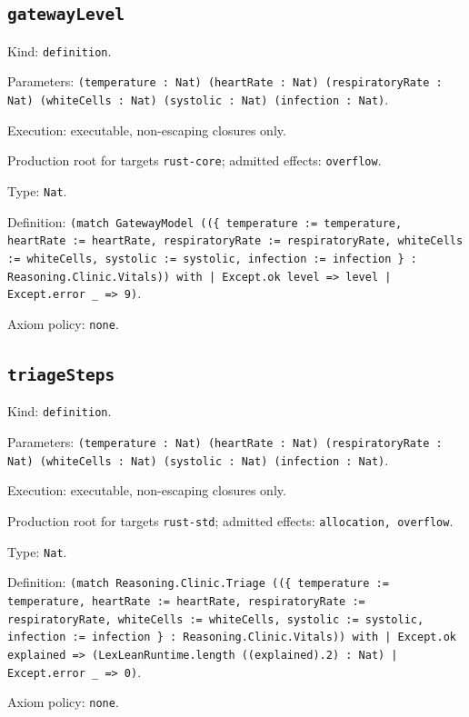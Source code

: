 \documentclass[11pt]{article}
\begin{document}
\subsection*{\texttt{gatewayLevel}}
\noindent Kind: \texttt{definition}.\par
\noindent Parameters: \texttt{(temperature : Nat) (heartRate : Nat) (respiratoryRate : Nat) (whiteCells : Nat) (systolic : Nat) (infection : Nat)}.\par
\noindent Execution: executable, non-escaping closures only.\par
\noindent Production root for targets \texttt{rust-core}; admitted effects: \texttt{overflow}.\par
\noindent Type: \texttt{Nat}.\par
\noindent Definition: \texttt{(match GatewayModel ((\{ temperature := temperature, heartRate := heartRate, respiratoryRate := respiratoryRate, whiteCells := whiteCells, systolic := systolic, infection := infection \} : Reasoning.Clinic.Vitals)) with | Except.ok level => level | Except.error \_ => 9)}.\par
\noindent Axiom policy: \texttt{none}.\par
\subsection*{\texttt{triageSteps}}
\noindent Kind: \texttt{definition}.\par
\noindent Parameters: \texttt{(temperature : Nat) (heartRate : Nat) (respiratoryRate : Nat) (whiteCells : Nat) (systolic : Nat) (infection : Nat)}.\par
\noindent Execution: executable, non-escaping closures only.\par
\noindent Production root for targets \texttt{rust-std}; admitted effects: \texttt{allocation, overflow}.\par
\noindent Type: \texttt{Nat}.\par
\noindent Definition: \texttt{(match Reasoning.Clinic.Triage ((\{ temperature := temperature, heartRate := heartRate, respiratoryRate := respiratoryRate, whiteCells := whiteCells, systolic := systolic, infection := infection \} : Reasoning.Clinic.Vitals)) with | Except.ok explained => (LexLeanRuntime.length ((explained).2) : Nat) | Except.error \_ => 0)}.\par
\noindent Axiom policy: \texttt{none}.\par
\end{document}
